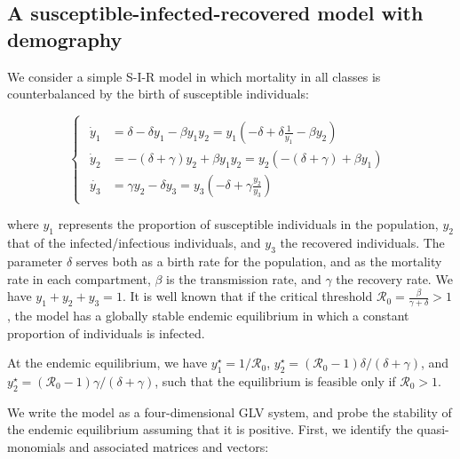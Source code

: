 \documentclass{article}
\begin{document}
\hypertarget{a-susceptible-infected-recovered-model-with-demography}{%
\subsection{A susceptible-infected-recovered model with
demography}\label{a-susceptible-infected-recovered-model-with-demography}}

\label{sec:sir}

We consider a simple S-I-R model in which mortality in all classes is
counterbalanced by the birth of susceptible individuals:

\begin{equation}
\label{eq:sir}
\begin{cases}
\begin{aligned}
\dot{y}_1 &= \delta - \delta y_1 - \beta y_1 y_2 = y_1 \left(-\delta + \delta \frac{1}{y_1} - \beta y_2 \right)\\
\dot{y}_2 &= - (\delta + \gamma) y_2 + \beta y_1 y_2 = y_2 \left(-(\delta + \gamma) + \beta y_1 \right)\\
\dot{y_3} &= \gamma y_2 - \delta y_3 = y_3 \left(-\delta + \gamma \frac{y_2}{y_3} \right)
\end{aligned}
\end{cases}
\end{equation}

where \(y_1\) represents the proportion of susceptible individuals in
the population, \(y_2\) that of the infected/infectious individuals, and
\(y_3\) the recovered individuals. The parameter \(\delta\) serves both
as a birth rate for the population, and as the mortality rate in each
compartment, \(\beta\) is the transmission rate, and \(\gamma\) the
recovery rate. We have \(y_1 + y_2 + y_3 = 1\). It is well known that if
the critical threshold
\(\mathcal R_0 = \frac{\beta}{\gamma + \delta} > 1\), the model has a
globally stable endemic equilibrium in which a constant proportion of
individuals is infected.

At the endemic equilibrium, we have \(y_1^\star = 1 / \mathcal R_0\),
\(y_2^\star = (\mathcal R_0 - 1) \delta / (\delta + \gamma)\), and
\(y_2^\star = (\mathcal R_0 - 1) \gamma / (\delta + \gamma)\), such that
the equilibrium is feasible only if \(\mathcal R_0 >1\).

We write the model as a four-dimensional GLV system, and probe the
stability of the endemic equilibrium assuming that it is positive.
First, we identify the quasi-monomials and associated matrices and
vectors:
\end{document}
